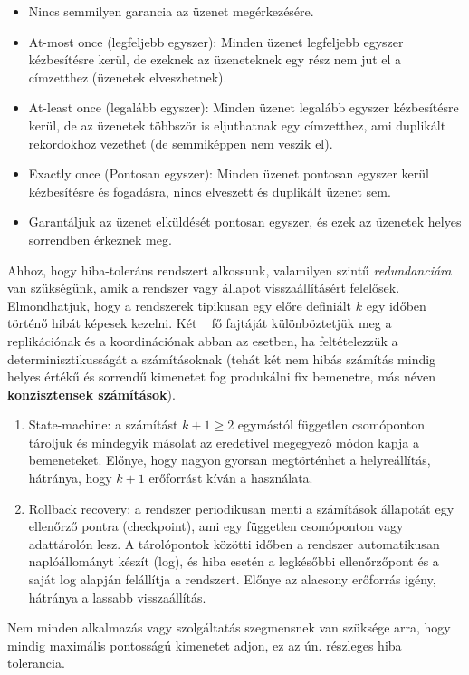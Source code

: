 \documentclass[a4paper,12pt]{article}
\begin{document}
\begin{itemize}
\item Nincs semmilyen garancia az üzenet megérkezésére.
\item At-most once (legfeljebb egyszer): Minden üzenet legfeljebb egyszer kézbesítésre kerül, de ezeknek az üzeneteknek egy rész nem jut el a címzetthez (üzenetek elveszhetnek).
\item At-least once (legalább egyszer): Minden üzenet legalább egyszer kézbesítésre kerül, de az üzenetek többször is eljuthatnak egy címzetthez, ami duplikált rekordokhoz vezethet (de semmiképpen nem veszik el).
\item Exactly once (Pontosan egyszer): Minden üzenet pontosan egyszer kerül kézbesítésre és fogadásra, nincs elveszett és duplikált üzenet sem.
\item Garantáljuk az üzenet elküldését pontosan egyszer, és ezek az üzenetek helyes sorrendben érkeznek meg.
\end{itemize}

Ahhoz, hogy hiba-toleráns rendszert alkossunk, valamilyen szintű \textit{redundanciára} van szükségünk, amik a rendszer vagy állapot visszaállításért felelősek. Elmondhatjuk, hogy a rendszerek tipikusan egy előre definiált $k$ egy időben történő hibát képesek kezelni. Két ~\parencite{balazinska} fő fajtáját különböztetjük meg a replikációnak és a koordinációnak abban az esetben, ha feltételezzük a determinisztikusságát a számításoknak (tehát két nem hibás számítás mindig helyes értékű és sorrendű kimenetet fog produkálni fix bemenetre, más néven \textbf{konzisztensek számítások}). 

\begin{enumerate}
\item State-machine: a számítást $k+1\ge2$ egymástól független csomóponton tároljuk és mindegyik másolat az eredetivel megegyező módon kapja a bemeneteket. Előnye, hogy nagyon gyorsan megtörténhet a helyreállítás, hátránya, hogy $k+1$ erőforrást kíván a használata.
\item Rollback recovery: a rendszer periodikusan menti a számítások állapotát egy ellenőrző pontra (checkpoint), ami egy független csomóponton vagy adattárolón lesz. A tárolópontok közötti időben a rendszer automatikusan naplóállományt készít (log), és hiba esetén a legkésőbbi ellenőrzőpont és a saját log alapján felállítja a rendszert. Előnye az alacsony erőforrás igény, hátránya a lassabb visszaállítás. 
\end{enumerate}

Nem minden alkalmazás vagy szolgáltatás szegmensnek van szüksége arra, hogy mindig maximális pontosságú kimenetet adjon, ez az ún. részleges hiba tolerancia. 
\end{document}
